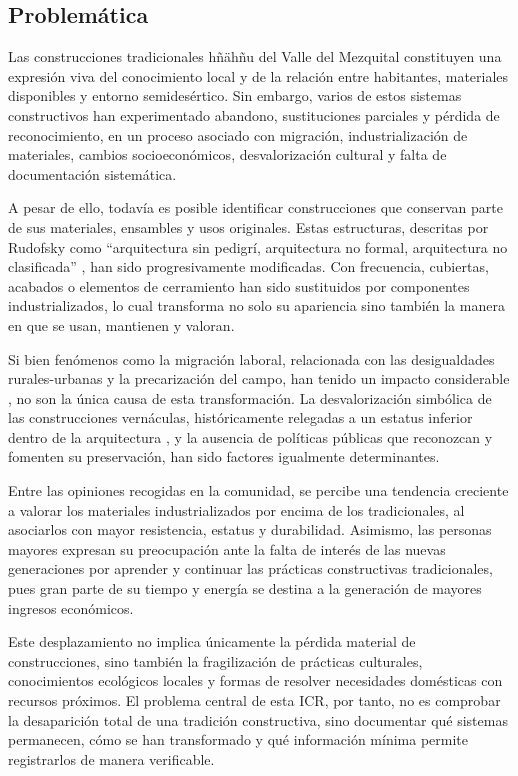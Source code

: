 \subsection{Problemática}

Las construcciones tradicionales hñähñu del Valle del Mezquital constituyen una expresión viva del conocimiento local y de la relación entre habitantes, materiales disponibles y entorno semidesértico. Sin embargo, varios de estos sistemas constructivos han experimentado abandono, sustituciones parciales y pérdida de reconocimiento, en un proceso asociado con migración, industrialización de materiales, cambios socioeconómicos, desvalorización cultural y falta de documentación sistemática.

A pesar de ello, todavía es posible identificar construcciones que conservan parte de sus materiales, ensambles y usos originales. Estas estructuras, descritas por Rudofsky como \enquote{arquitectura sin pedigrí, arquitectura no formal, arquitectura no clasificada} \citep[p. 9]{rudofsky1964}, han sido progresivamente modificadas. Con frecuencia, cubiertas, acabados o elementos de cerramiento han sido sustituidos por componentes industrializados, lo cual transforma no solo su apariencia sino también la manera en que se usan, mantienen y valoran.

Si bien fenómenos como la migración laboral, relacionada con las desigualdades rurales-urbanas y la precarización del campo, han tenido un impacto considerable \citep{monroy2009, boils2010dadho}, no son la única causa de esta transformación. La desvalorización simbólica de las construcciones vernáculas, históricamente relegadas a un estatus inferior dentro de la arquitectura \citep[p. 2]{torres1999revista}, y la ausencia de políticas públicas que reconozcan y fomenten su preservación, han sido factores igualmente determinantes.

Entre las opiniones recogidas en la comunidad, se percibe una tendencia creciente a valorar los materiales industrializados por encima de los tradicionales, al asociarlos con mayor resistencia, estatus y durabilidad. Asimismo, las personas mayores expresan su preocupación ante la falta de interés de las nuevas generaciones por aprender y continuar las prácticas constructivas tradicionales, pues gran parte de su tiempo y energía se destina a la generación de mayores ingresos económicos.

Este desplazamiento no implica únicamente la pérdida material de construcciones, sino también la fragilización de prácticas culturales, conocimientos ecológicos locales y formas de resolver necesidades domésticas con recursos próximos. El problema central de esta ICR, por tanto, no es comprobar la desaparición total de una tradición constructiva, sino documentar qué sistemas permanecen, cómo se han transformado y qué información mínima permite registrarlos de manera verificable.

